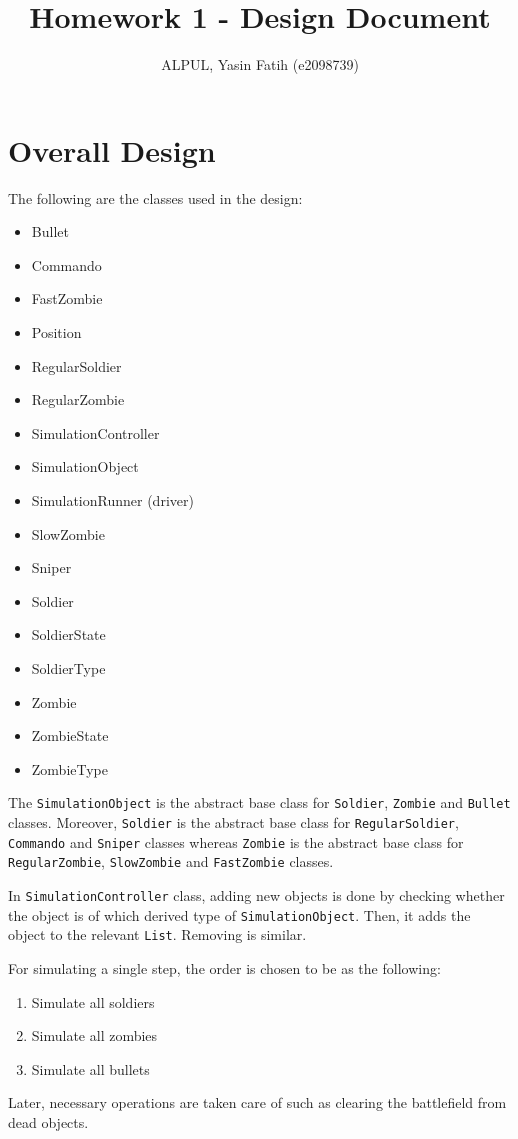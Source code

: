 \documentclass[12pt]{article}
\author{ALPUL, Yasin Fatih (e2098739)}
\title{Homework 1 - Design Document}
\begin{document}
\maketitle

\section{Overall Design}
The following are the classes used in the design:
\begin{itemize}
  \item Bullet
  \item Commando
  \item FastZombie
  \item Position
  \item RegularSoldier
  \item RegularZombie
  \item SimulationController
  \item SimulationObject
  \item SimulationRunner (driver)
  \item SlowZombie
  \item Sniper
  \item Soldier
  \item SoldierState
  \item SoldierType
  \item Zombie
  \item ZombieState
  \item ZombieType
\end{itemize}

The \texttt{SimulationObject} is the abstract base class for
  \texttt{Soldier}, \texttt{Zombie} and \texttt{Bullet} classes.
  Moreover, \texttt{Soldier} is the abstract base class for
  \texttt{RegularSoldier}, \texttt{Commando} and \texttt{Sniper}
  classes whereas \texttt{Zombie} is the abstract base class for
  \texttt{RegularZombie}, \texttt{SlowZombie} and
  \texttt{FastZombie} classes.

In \texttt{SimulationController} class, adding new objects is
  done by checking whether the object is of which derived type
  of \texttt{SimulationObject}. Then, it adds the object to the
  relevant \texttt{List}. Removing is similar.

For simulating a single step, the order is chosen to be as the
  following:
  \begin{enumerate}
    \item Simulate all soldiers
    \item Simulate all zombies
    \item Simulate all bullets
  \end{enumerate}
  Later, necessary operations are taken care of such as clearing
  the battlefield from dead objects.
\end{document}
